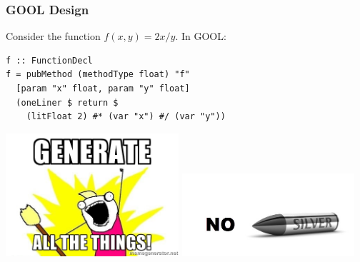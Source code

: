 \documentclass{beamer}
\begin{document}
\begin{frame}
\frametitle{GOOL Design}
Consider the function $f(x, y) = 2x/y$.  In GOOL:
\begin{lstlisting}
f :: FunctionDecl
f = pubMethod (methodType float) "f"
  [param "x" float, param "y" float] 
  (oneLiner $ return $ 
    (litFloat 2) #* (var "x") #/ (var "y"))
\end{lstlisting}
\end{frame}

% 

\begin{frame}
\includegraphics[width=0.48\textwidth]{generate_all_the_things.jpg}
\includegraphics[width=0.48\textwidth]{no_silver_bullet.jpg}
\end{frame}
\end{document}
